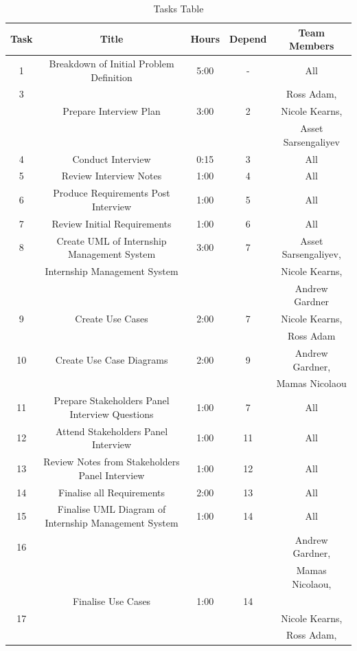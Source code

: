 \documentclass{l3deliverable}
\begin{document}
{\begin{table}
\caption{Tasks Table} %
\begin{tabular}{|c |c |c |c |c |} %
\hline\hline                        %
Task & Title & Hours & Depend & Team Members \\ [0.5ex]
\hline1 & Breakdown of Initial Problem Definition & 5:00 &-& All\\ %
\hline3 & &  & & Ross Adam, \\
 &  Prepare Interview Plan&3:00 &2 &Nicole Kearns, \\
 & & & &Asset Sarsengaliyev \\
\hline4 & Conduct Interview & 0:15 &3& All\\
\hline5 & Review Interview Notes& 1:00 &4& All\\
\hline6 & Produce Requirements Post Interview & 1:00 &5& All\\
\hline7 & Review Initial Requirements & 1:00 &6& All \\
\hline8 & Create UML of Internship Management System & 3:00 &7 &Asset Sarsengaliyev, \\
&Internship Management System& & &Nicole Kearns,  \\
& & & & Andrew Gardner \\
\hline9  & Create Use Cases & 2:00&7 &Nicole Kearns,\\
 & & & & Ross Adam \\
\hline10  & Create Use Case Diagrams &2:00 &9 &  Andrew Gardner, \\
 & & & & Mamas Nicolaou \\
\hline11 & Prepare Stakeholders Panel Interview Questions & 1:00 &7& All\\
\hline12 & Attend Stakeholders Panel Interview & 1:00 &11& All\\
\hline13 & Review Notes from Stakeholders Panel Interview & 1:00 &12& All\\
\hline14 & Finalise all Requirements & 2:00 &13& All\\
\hline15 & Finalise UML Diagram of Internship Management System & 1:00 &14& All\\
\hline16 & &  & & Andrew Gardner, \\
 & & & & Mamas Nicolaou, \\
 & Finalise Use Cases & 1:00& 14& \\
\hline17 &  & & & Nicole Kearns, \\
 & & & & Ross Adam, \\

\end{tabular}
\end{table}}
\end{document}

